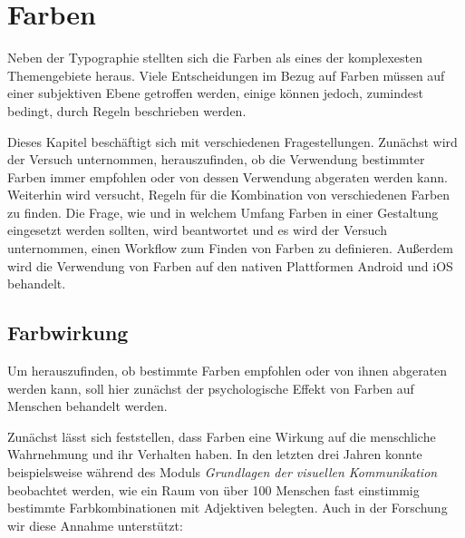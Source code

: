 
\chapter{Farben} %

\label{Farben} %



Neben der Typographie stellten sich die Farben als eines der komplexesten Themengebiete heraus. Viele Entscheidungen im Bezug auf Farben müssen auf einer subjektiven Ebene getroffen werden, einige können jedoch, zumindest bedingt, durch Regeln beschrieben werden.

Dieses Kapitel beschäftigt sich mit verschiedenen Fragestellungen. Zunächst wird der Versuch unternommen, herauszufinden, ob die Verwendung bestimmter Farben immer empfohlen oder von dessen Verwendung abgeraten werden kann.
Weiterhin wird versucht, Regeln für die Kombination von verschiedenen Farben zu finden. Die Frage, wie und in welchem Umfang Farben in einer Gestaltung eingesetzt werden sollten, wird beantwortet und es wird der Versuch unternommen, einen Workflow zum Finden von Farben zu definieren. Außerdem wird die Verwendung von Farben auf den nativen Plattformen Android und iOS behandelt.


\section{Farbwirkung}

Um herauszufinden, ob bestimmte Farben empfohlen oder von ihnen abgeraten werden kann, soll hier zunächst der psychologische Effekt von Farben auf Menschen behandelt werden.

Zunächst lässt sich feststellen, dass Farben eine Wirkung auf die menschliche Wahrnehmung und ihr Verhalten haben. In den letzten drei Jahren konnte beispielsweise während des Moduls \textit{Grundlagen der visuellen Kommunikation} beobachtet werden, wie ein Raum von über 100 Menschen fast einstimmig bestimmte Farbkombinationen mit Adjektiven belegten. Auch in der Forschung wir diese Annahme unterstützt:

